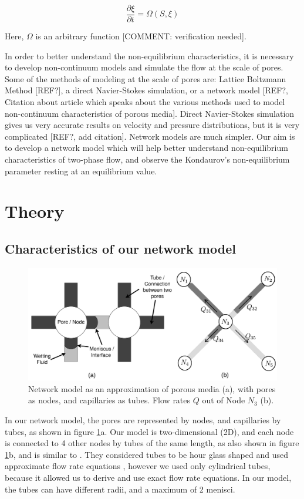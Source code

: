 \documentclass[
	12pt
] {article}
\begin{document}
	\begin{equation}
		\frac{\partial \xi}{\partial t} = \Omega ( S, \xi )
	\end{equation}
		
	Here, $\Omega$ is an arbitrary function [COMMENT: verification needed].
	
	In order to better understand the non-equilibrium characteristics, it is necessary to develop non-continuum models and simulate the flow at the scale of pores. Some of the methods of modeling at the scale of pores are: Lattice Boltzmann Method [REF?], a direct Navier-Stokes simulation, or a network model [REF?, Citation about article which speaks about the various methods used to model non-continuum characteristics of porous media]. Direct Navier-Stokes simulation gives us very accurate results on velocity and pressure distributions, but it is very complicated [REF?, add citation]. Network models are much simpler. Our aim is to develop a network model which will help better understand non-equilibrium characteristics of two-phase flow, and observe the Kondaurov's non-equilibrium parameter resting at an equilibrium value.
	
\section{Theory}
\subsection{Characteristics of our network model}
	\begin{figure}
		\centering
		\includegraphics[width=\textwidth]{fig_1_2200x1000}
		\caption{Network model as an approximation of porous media (a), with pores as nodes, and capillaries as tubes. Flow rates $Q$ out of Node $N_3$ (b).}
		\label{fig:1}
	\end{figure}
	
	In our network model, the pores are represented by nodes, and capillaries by tubes, as shown in figure \ref{fig:1}a. Our model is two-dimensional (2D), and each node is connected to 4 other nodes by tubes of the same length, as also shown in figure \ref{fig:1}b, and is similar to \cite{aker1998two}. They considered tubes to be hour glass shaped and used approximate flow rate equations \cite{washburn1921dynamics}, however we used only cylindrical tubes, because it allowed us to derive and use exact flow rate equations. In our model, the tubes can have different radii, and a maximum of 2 menisci.
	
\end{document}
